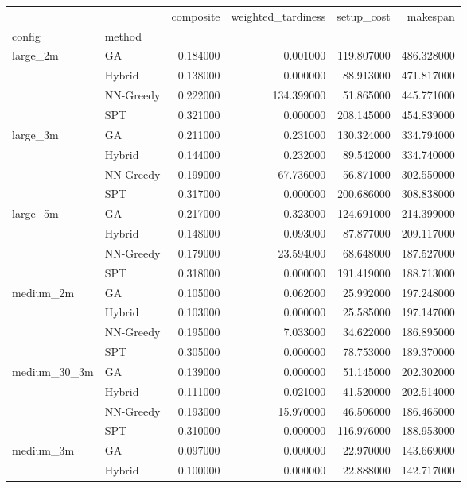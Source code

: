\begin{tabular}{llrrrr}
\toprule
 &  & composite & weighted_tardiness & setup_cost & makespan \\
config & method &  &  &  &  \\
\midrule
\multirow[t]{4}{*}{large_2m} & GA & 0.184000 & 0.001000 & 119.807000 & 486.328000 \\
 & Hybrid & 0.138000 & 0.000000 & 88.913000 & 471.817000 \\
 & NN-Greedy & 0.222000 & 134.399000 & 51.865000 & 445.771000 \\
 & SPT & 0.321000 & 0.000000 & 208.145000 & 454.839000 \\
\cline{1-6}
\multirow[t]{4}{*}{large_3m} & GA & 0.211000 & 0.231000 & 130.324000 & 334.794000 \\
 & Hybrid & 0.144000 & 0.232000 & 89.542000 & 334.740000 \\
 & NN-Greedy & 0.199000 & 67.736000 & 56.871000 & 302.550000 \\
 & SPT & 0.317000 & 0.000000 & 200.686000 & 308.838000 \\
\cline{1-6}
\multirow[t]{4}{*}{large_5m} & GA & 0.217000 & 0.323000 & 124.691000 & 214.399000 \\
 & Hybrid & 0.148000 & 0.093000 & 87.877000 & 209.117000 \\
 & NN-Greedy & 0.179000 & 23.594000 & 68.648000 & 187.527000 \\
 & SPT & 0.318000 & 0.000000 & 191.419000 & 188.713000 \\
\cline{1-6}
\multirow[t]{4}{*}{medium_2m} & GA & 0.105000 & 0.062000 & 25.992000 & 197.248000 \\
 & Hybrid & 0.103000 & 0.000000 & 25.585000 & 197.147000 \\
 & NN-Greedy & 0.195000 & 7.033000 & 34.622000 & 186.895000 \\
 & SPT & 0.305000 & 0.000000 & 78.753000 & 189.370000 \\
\cline{1-6}
\multirow[t]{4}{*}{medium_30_3m} & GA & 0.139000 & 0.000000 & 51.145000 & 202.302000 \\
 & Hybrid & 0.111000 & 0.021000 & 41.520000 & 202.514000 \\
 & NN-Greedy & 0.193000 & 15.970000 & 46.506000 & 186.465000 \\
 & SPT & 0.310000 & 0.000000 & 116.976000 & 188.953000 \\
\cline{1-6}
\multirow[t]{4}{*}{medium_3m} & GA & 0.097000 & 0.000000 & 22.970000 & 143.669000 \\
 & Hybrid & 0.100000 & 0.000000 & 22.888000 & 142.717000 \\

\end{tabular}
